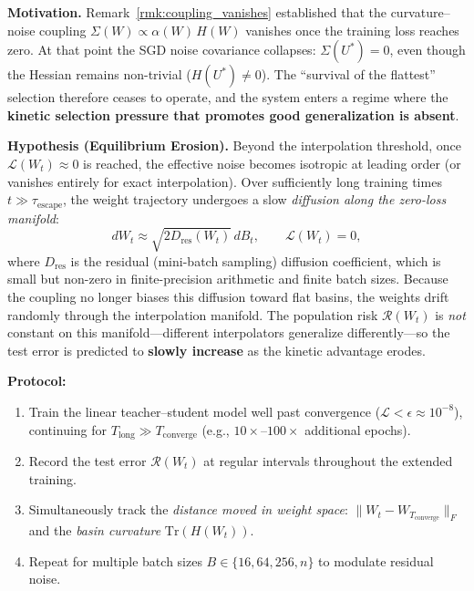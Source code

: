 \documentclass[
  journal=largetwo,
  simfonts=false,
  year=2025,
  volume=37,
]{cup-journal}
\begin{document}
\textbf{Motivation.}
Remark~\ref{rmk:coupling_vanishes} established that the curvature--noise coupling $\Sigma(W) \propto \alpha(W)\,H(W)$ vanishes once the training loss reaches zero. At that point the SGD noise covariance collapses: $\Sigma(U^*) = 0$, even though the Hessian remains non-trivial ($H(U^*) \neq 0$). The ``survival of the flattest'' selection therefore ceases to operate, and the system enters a regime where the \textbf{kinetic selection pressure that promotes good generalization is absent}.

\textbf{Hypothesis (Equilibrium Erosion).}
Beyond the interpolation threshold, once $\mathcal{L}(W_t) \approx 0$ is reached, the effective noise becomes isotropic at leading order (or vanishes entirely for exact interpolation). Over sufficiently long training times $t \gg \tau_{\mathrm{escape}}$, the weight trajectory undergoes a slow \emph{diffusion along the zero-loss manifold}:
\begin{equation}\label{eq:erosion_diffusion}
    dW_t \approx \sqrt{2D_{\mathrm{res}}(W_t)}\,dB_t, \qquad \mathcal{L}(W_t) = 0,
\end{equation}
where $D_{\mathrm{res}}$ is the residual (mini-batch sampling) diffusion coefficient, which is small but non-zero in finite-precision arithmetic and finite batch sizes. Because the coupling no longer biases this diffusion toward flat basins, the weights drift randomly through the interpolation manifold. The population risk $\mathcal{R}(W_t)$ is \emph{not} constant on this manifold---different interpolators generalize differently---so the test error is predicted to \textbf{slowly increase} as the kinetic advantage erodes.

\textbf{Protocol:}
\begin{enumerate}
    \item Train the linear teacher--student model well past convergence ($\mathcal{L} < \epsilon \approx 10^{-8}$), continuing for $T_{\mathrm{long}} \gg T_{\mathrm{converge}}$ (e.g., $10\times$--$100\times$ additional epochs).
    \item Record the test error $\mathcal{R}(W_t)$ at regular intervals throughout the extended training.
    \item Simultaneously track the \emph{distance moved in weight space}: $\|W_t - W_{T_{\mathrm{converge}}}\|_F$ and the \emph{basin curvature} $\mathrm{Tr}(H(W_t))$.
    \item Repeat for multiple batch sizes $B \in \{16, 64, 256, n\}$ to modulate residual noise.
\end{enumerate}
\end{document}

